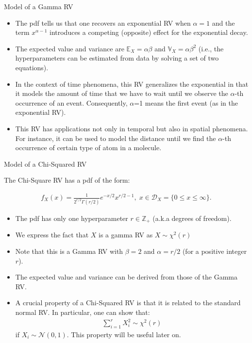 \documentclass[9pt]{beamer}
\begin{document}
%
\begin{frame}{Model of a Gamma RV}

\begin{itemize}
\item The pdf tells us that one recovers an exponential RV when $\alpha=1$ and the term $x^{\alpha-1}$ introduces a competing (opposite) effect for the exponential decay. 
\item The expected value and variance are $\mathbb{E}_X=\alpha\beta$ and $\mathbb{V}_X=\alpha\beta^2$ (i.e., the hyperparameters can be estimated from data by solving a set of two equations). 
\item In the context of time phenomena, this RV generalizes the exponential in that it models the amount of time that we have to wait until we observe the $\alpha$-th occurrence of an event. Consequently, $\alpha$=1 means the first event (as in the exponential RV). 
\item This RV has applications not only in temporal but also in spatial phenomena. For instance, it can be used to model the distance until we find the $\alpha$-th occurrence of certain type of atom in a molecule.  
\end{itemize}

\end{frame}



%
\begin{frame}{Model of a Chi-Squared RV}

The Chi-Square RV has a pdf of the form:
\begin{block}{}
\begin{align*}
f_X(x)=\frac{1}{2^{r/2}\Gamma(r/2)}e^{-x/2}x^{r/2-1},\; x\in \mathcal{D}_X=\{0\leq x\leq \infty\}.
\end{align*}
\end{block}
\begin{itemize}
\item The pdf has only one hyperparameter $r\in \mathbb{Z}_+$ (a.k.a degrees of freedom).
\item We express the fact that $X$ is a gamma RV as $X\sim \chi^2(r)$
\item Note that this is a Gamma RV with $\beta=2$ and $\alpha=r/2$ (for a positive integer $r$). 
\item The expected value and variance can be derived from those of the Gamma RV.  
\item A crucial property of a Chi-Squared RV is that it is related to the standard normal RV. In particular, one can show that: 
\begin{align*}
\sum_{i=1}^rX_i^2\sim \chi^2(r)
\end{align*}
if $X_i\sim \mathcal{N}(0,1)$. This property will be useful later on. 
\end{itemize}

\end{frame}
\end{document}
